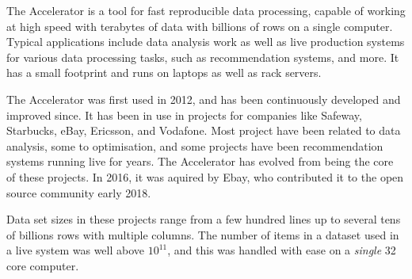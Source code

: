 
The Accelerator is a tool for fast reproducible data processing, capable of working
at high speed with terabytes of data with billions of rows on a single
computer.  Typical applications include data analysis work as well as
live production systems for various data processing tasks, such as
recommendation systems, and more.  It has a small footprint and runs
on laptops as well as rack servers.

The Accelerator was first used in 2012, and has been continuously developed and
improved since.  It has been in use in projects for companies like
Safeway, Starbucks, eBay, Ericsson, and Vodafone.  Most project have
been related to data analysis, some to optimisation, and some projects
have been recommendation systems running live for years.  The
Accelerator has evolved from being the core of these projects.  In
2016, it was aquired by Ebay, who contributed it to the open source
community early 2018.

Data set sizes in these projects range from a few hundred lines up to
several tens of billions rows with multiple columns.  The number of
items in a dataset used in a live system was well above $10^{11}$, and
this was handled with ease on a \emph{single} 32 core computer.

